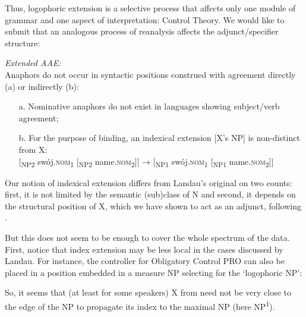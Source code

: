 \documentclass[output=paper,modfonts,nonflat
]{langsci/langscibook}
\begin{document}
\noindent Thus, logophoric extension is a selective process that affects only one module of grammar and one aspect of interpretation: Control Theory. We would like to submit that an analogous process of reanalysis affects the adjunct/specifier structure:

\ea \label{ex:witkos:63}
\textit{Extended AAE:}\\
Anaphors do not occur in syntactic positions construed with agreement directly (a) or indirectly (b):\\
\begin{itemize}
    \item[a.] Nominative anaphors do not exist in languages showing subject/verb agreement;\\
    \item[b.] For the purpose of binding, an indexical extension [X’s NP] is non-distinct from X:\\
    $[$\textsubscript{NP2} swój.\textsc{nom}\textsubscript{1} [\textsubscript{NP2} name.\textsc{nom}\textsubscript{2}$]]$ → [\textsubscript{NP1} swój.\textsc{nom}\textsubscript{1} [\textsubscript{NP1} name.\textsc{nom}\textsubscript{2}$]]$\\
\end{itemize}
\z

\noindent Our notion of indexical extension differs from Landau’s original on two counts: first, it is not limited by the semantic (sub)class of N and second, it depends on the structural position of X, which we have shown to act as an adjunct, following \cite{despic2011,despic2013,despic2015}.

But this does not seem to be enough to cover the whole spectrum of the data. First, notice that index extension may be less local in the cases discussed by Landau. For instance, the controller for Obligatory Control PRO can also be placed in a position embedded in a measure NP selecting for the ‘logophoric NP’:
    
\z

\noindent So, it seems that (at least for some speakers) X from  need not be very close to the edge of the NP to propagate its index to the maximal NP (here NP\textsuperscript{1}).
\end{document}
